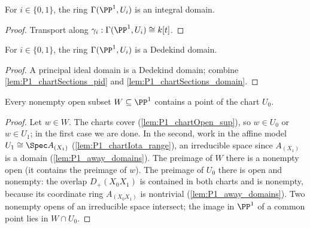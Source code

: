 \begin{lemma}
  \label{lem:P1_chartSections_domain}
  \leanok
  For \(i \in \{0,1\}\), the ring \(\Gamma(\PP^1, U_i)\) is an integral domain.
\end{lemma}
\begin{proof}
  \leanok
  Transport along \(\gamma_i : \Gamma(\PP^1, U_i) \cong k[t]\).
\end{proof}

\begin{theorem}
  \label{thm:P1_chartSections_dedekind}
  \leanok
  For \(i \in \{0,1\}\), the ring \(\Gamma(\PP^1, U_i)\) is a Dedekind domain.
\end{theorem}
\begin{proof}
  \leanok
  A principal ideal domain is a Dedekind domain; combine
  \ref{lem:P1_chartSections_pid} and \ref{lem:P1_chartSections_domain}.
\end{proof}

\begin{lemma}
  \label{lem:P1_dense_chart}
  \leanok
  Every nonempty open subset \(W \subseteq \PP^1\) contains a point of the chart \(U_0\).
\end{lemma}
\begin{proof}
  \leanok
  Let \(w \in W\). The charts cover (\ref{lem:P1_chartOpen_sup}), so \(w \in U_0\) or
  \(w \in U_1\); in the first case we are done. In the second, work in the affine model
  \(U_1 \cong \Spec A_{(X_1)}\) (\ref{lem:P1_chartIota_range}), an irreducible space since
  \(A_{(X_1)}\) is a domain (\ref{lem:P1_away_domains}). The preimage of \(W\) there is a
  nonempty open (it contains the preimage of \(w\)). The preimage of \(U_0\) there is open
  and nonempty: the overlap \(D_+(X_0X_1)\) is contained in both charts and is nonempty,
  because its coordinate ring \(A_{(X_0X_1)}\) is nontrivial (\ref{lem:P1_away_domains}).
  Two nonempty opens of an irreducible space intersect; the image in \(\PP^1\) of a common
  point lies in \(W \cap U_0\).
\end{proof}

